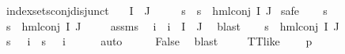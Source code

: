 \begin{isabellebody}
\isanewline
{}\isamarkupfalse%
\ index{\isacharunderscore}{\kern0pt}sets{\isacharunderscore}{\kern0pt}conj{\isacharunderscore}{\kern0pt}disjunct{\isacharcolon}{\kern0pt}\isanewline
\ \ \ {\isachardoublequoteopen}I\ {\isasyminter}\ J\ {\isasymnoteq}\ {\isacharbraceleft}{\kern0pt}{\isacharbraceright}{\kern0pt}{\isachardoublequoteclose}\isanewline
\ \ \ {\isachardoublequoteopen}{\isasymforall}s{\isachardot}{\kern0pt}\ {\isasymnot}\ {\isacharparenleft}{\kern0pt}s\ {\isasymTurnstile}\ {\isacharparenleft}{\kern0pt}hml{\isacharunderscore}{\kern0pt}conj\ I\ J\ {\isasymPhi}{\isacharparenright}{\kern0pt}{\isacharparenright}{\kern0pt}{\isachardoublequoteclose}\isanewline
%
\isadelimproof
%
\endisadelimproof
%
\isatagproof
{}\isamarkupfalse%
{\isacharparenleft}{\kern0pt}safe{\isacharparenright}{\kern0pt}\isanewline
\ \ \isamarkupfalse%
\ s\isanewline
\ \ \isamarkupfalse%
\ {\isachardoublequoteopen}s\ {\isasymTurnstile}\ hml{\isacharunderscore}{\kern0pt}conj\ I\ J\ {\isasymPhi}{\isachardoublequoteclose}\isanewline
\ \ \isamarkupfalse%
\ assms\ \isamarkupfalse%
\ i\ \ {\isachardoublequoteopen}i\ {\isasymin}\ I\ {\isasyminter}\ J{\isachardoublequoteclose}\ \isamarkupfalse%
\ blast\isanewline
\ \ \isamarkupfalse%
\ {\isacartoucheopen}s\ {\isasymTurnstile}\ hml{\isacharunderscore}{\kern0pt}conj\ I\ J\ {\isasymPhi}{\isacartoucheclose}\ \isamarkupfalse%
\ {\isachardoublequoteopen}{\isacharparenleft}{\kern0pt}{\isacharparenleft}{\kern0pt}s\ {\isasymTurnstile}\ {\isacharparenleft}{\kern0pt}{\isasymPhi}\ i{\isacharparenright}{\kern0pt}{\isacharparenright}{\kern0pt}\ {\isasymand}\ {\isacharparenleft}{\kern0pt}{\isasymnot}{\isacharparenleft}{\kern0pt}s\ {\isasymTurnstile}\ {\isacharparenleft}{\kern0pt}{\isasymPhi}\ i{\isacharparenright}{\kern0pt}{\isacharparenright}{\kern0pt}{\isacharparenright}{\kern0pt}{\isacharparenright}{\kern0pt}{\isachardoublequoteclose}\isanewline
\ \ \ \ \isamarkupfalse%
\ auto\isanewline
\ \ \isamarkupfalse%
\ \isamarkupfalse%
\ False\ \isamarkupfalse%
\ blast\isanewline
{}\isamarkupfalse%
%
\endisatagproof
{\isafoldproof}%
%
\isadelimproof
\isanewline
%
\endisadelimproof
\isanewline
{}\isamarkupfalse%
\ \isanewline
\ \ \ {\isachardoublequoteopen}TT{\isacharunderscore}{\kern0pt}like\ {\isasymphi}{\isachardoublequoteclose}\isanewline
\ \ \ {\isachardoublequoteopen}p\ {\isasymTurnstile}\ {\isasymphi}{\isachardoublequoteclose}\isanewline

\end{isabellebody}

